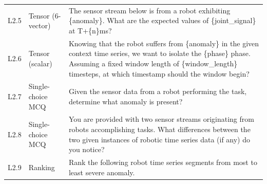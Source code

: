 \begin{small}
\begin{longtable}{@{}>{\centering\arraybackslash}p{}>{\raggedright\arraybackslash}p{}>{\raggedright\arraybackslash}p{}@{}}
        L2.5        & Tensor (6-vector)      & The sensor stream below is from a robot exhibiting \{anomaly\}. What are the expected values of \{joint\_signal\} at T+\{n\}ms?                                                                                                                                                                                                                                                                                                                                                                    \\
        L2.6        & Tensor (scalar)        & Knowing that the robot suffers from \{anomaly\} in the given context time series, we want to isolate the \{phase\} phase. Assuming a fixed window length of \{window\_length\} timesteps, at which timestamp should the window begin?                                                                                                                                                                                                                                                              \\
        L2.7        & Single-choice MCQ      & Given the sensor data from a robot performing the task, determine what anomaly is present?                                                                                                                                                                                                                                                                                                                                                                                                         \\
        L2.8        & Single-choice MCQ      & You are provided with two sensor streams originating from robots accomplishing tasks. What differences between the two given instances of robotic time series data (if any) do you notice?                                                                                                                                                                                                                                                                                                         \\
        L2.9        & Ranking                & Rank the following robot time series segments from most to least severe anomaly.                                                                                                                                                                                                                                                                                                                                                                                                                   \\

\end{longtable}
\end{small}
